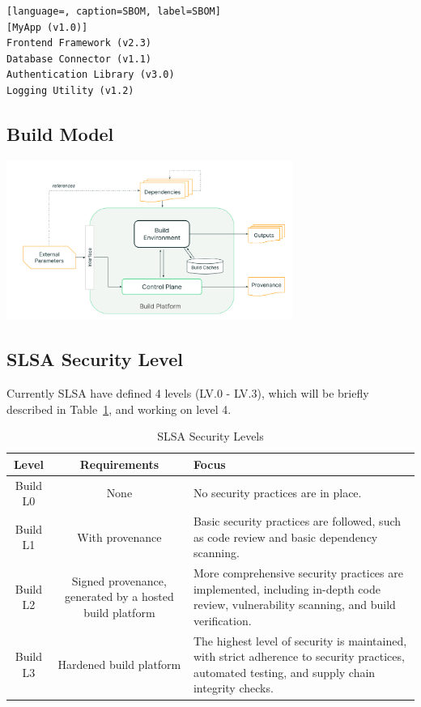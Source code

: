 \begin{lstlisting}[language=, caption=SBOM, label=SBOM]
[MyApp (v1.0)]
Frontend Framework (v2.3)
Database Connector (v1.1)
Authentication Library (v3.0)
Logging Utility (v1.2)
\end{lstlisting}

\subsection{Build Model}
\includegraphics[width=0.7\textwidth]{./screenshot/build_model.png}

\subsection{SLSA Security Level}
Currently SLSA have defined 4 levels (LV.0 - LV.3), which will be 
briefly described in Table~\ref{tab:slsa-levels}, and working on level 4.
\begin{table}[ht]
  \centering
  \caption{SLSA Security Levels}
  \label{tab:slsa-levels}
  \begin{tabular}{|c|c|p{6cm}|}
  \hline
  \textbf{Level} & \textbf{Requirements} & \textbf{Focus} \\
  \hline
  Build L0 & None & No security practices are in place. \\
  \hline
  Build L1 & With provenance & Basic security practices are followed, such as code review and basic dependency scanning. \\
  \hline
  Build L2 & Signed provenance, generated by a hosted build platform & More comprehensive security practices are implemented, including in-depth code review, vulnerability scanning, and build verification. \\
  \hline
  Build L3 & Hardened build platform & The highest level of security is maintained, with strict adherence to security practices, automated testing, and supply chain integrity checks. \\
  \hline
  \end{tabular}
\end{table}


